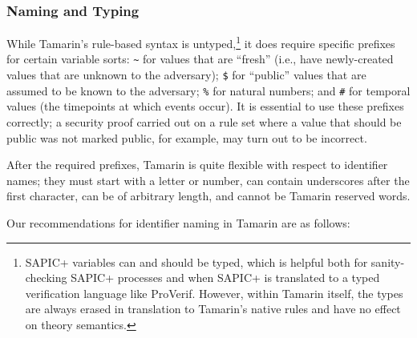 \subsubsection{Naming and Typing}

While Tamarin's rule-based syntax is untyped,\footnote{SAPIC+ variables can and should be typed, which is helpful both for sanity-checking SAPIC+ processes and when SAPIC+ is translated to a typed verification language like ProVerif. However, within Tamarin itself, the types are always erased in translation to Tamarin's native rules and have no effect on theory semantics.} it does require specific prefixes for certain variable sorts: \texttt{\textasciitilde} for values that are ``fresh'' (i.e., have newly-created values that are unknown to the adversary); \texttt{\$} for ``public'' values that are assumed to be known to the adversary; \texttt{\%} for natural numbers; and \texttt{\#} for temporal values (the timepoints at which events occur). It is essential to use these prefixes correctly; a security proof carried out on a rule set where a value that should be public was not marked public, for example, may turn out to be incorrect.

After the required prefixes, Tamarin is quite flexible with respect to identifier names; they must start with a letter or number, can contain underscores after the first character, can be of arbitrary length, and cannot be Tamarin reserved words.

Our recommendations for identifier naming in Tamarin are as follows:

